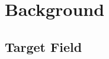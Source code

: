 	\section{Background}

	\begin{frame}
		
	\end{frame}

	\begin{frame}
		\addtocounter{framenumber}{-1}
		
	\end{frame}

	\begin{frame}
		\addtocounter{framenumber}{-1}
		
	\end{frame}

	\subsection{Target Field}

